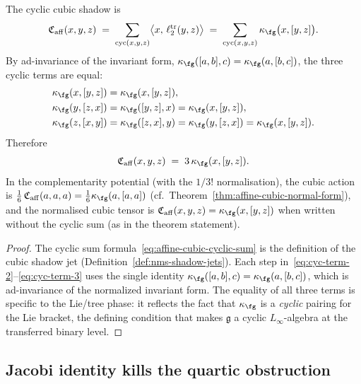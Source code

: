 \begin{proposition}\label{prop:affine-cubic-ad-invariance}
The cyclic cubic shadow is
\begin{equation}\label{eq:affine-cubic-cyclic-sum}
\mathfrak{C}_{\mathrm{aff}}(x,y,z)
\;=\;
\sum_{\mathrm{cyc}(x,y,z)}
\bigl\langle x,\,\ell_2^{\mathrm{tr}}(y,z)\bigr\rangle
\;=\;
\sum_{\mathrm{cyc}(x,y,z)} \kappa_{\fg}\bigl(x,[y,z]\bigr).
\end{equation}
By ad-invariance of the invariant form,
$\kappa_{\fg}([a,b],c) = \kappa_{\fg}(a,[b,c])$, the three cyclic terms
are equal:
\begin{align}
\kappa_{\fg}(x,[y,z]) &= \kappa_{\fg}(x,[y,z]),
 \label{eq:cyc-term-1}\\
\kappa_{\fg}(y,[z,x]) &= \kappa_{\fg}([y,z],x) = \kappa_{\fg}(x,[y,z]),
 \label{eq:cyc-term-2}\\
\kappa_{\fg}(z,[x,y]) &= \kappa_{\fg}([z,x],y) = \kappa_{\fg}(y,[z,x])
 = \kappa_{\fg}(x,[y,z]).
 \label{eq:cyc-term-3}
\end{align}
Therefore
\begin{equation}\label{eq:affine-cubic-three-equal}
\mathfrak{C}_{\mathrm{aff}}(x,y,z)
\;=\; 3\,\kappa_{\fg}(x,[y,z]).
\end{equation}
In the complementarity potential (with the $1/3!$ normalisation),
the cubic action is
$\frac{1}{6}\,\mathfrak{C}_{\mathrm{aff}}(a,a,a)
= \frac{1}{6}\kappa_{\fg}(a,[a,a])$
\textup{(cf.\ Theorem~\textup{\ref{thm:affine-cubic-normal-form}})},
and the normalised cubic tensor is
$\mathfrak{C}_{\mathrm{aff}}(x,y,z) = \kappa_{\fg}(x,[y,z])$ when
written without the cyclic sum
\textup{(as in the theorem statement)}.
\end{proposition}

\begin{proof}
The cyclic sum formula~\eqref{eq:affine-cubic-cyclic-sum} is the
definition of the cubic shadow jet
(Definition~\ref{def:nms-shadow-jets}). Each step
in~\eqref{eq:cyc-term-2}--\eqref{eq:cyc-term-3} uses the single
identity $\kappa_{\fg}([a,b],c) = \kappa_{\fg}(a,[b,c])$, which is
ad-invariance of the normalized invariant form. The equality of
all three terms is specific to the Lie/tree phase: it reflects the
fact that $\kappa_{\fg}$ is a \emph{cyclic} pairing for the Lie bracket,
the defining condition that makes $\mathfrak{g}$ a cyclic
$L_\infty$-algebra at the transferred binary level.
\end{proof}

\subsection{Jacobi identity kills the quartic obstruction}
\label{subsec:affine-jacobi-kills-quartic}

